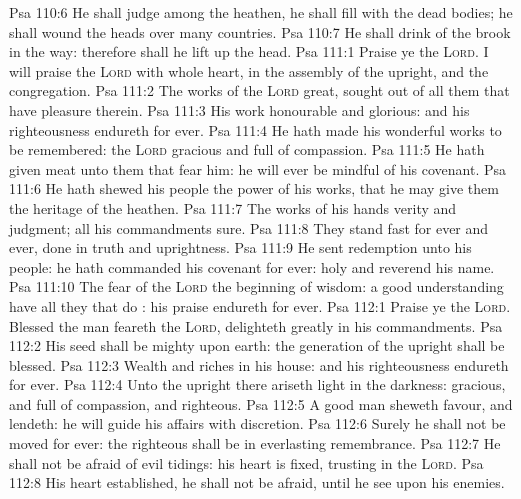 \vs Psa 110:6 He shall judge among the heathen, he shall fill  with the dead bodies; he shall wound the heads over many countries.
\vs Psa 110:7 He shall drink of the brook in the way: therefore shall he lift up the head.
\vs Psa 111:1 Praise ye the \textsc{Lord}. I will praise the \textsc{Lord} with  whole heart, in the assembly of the upright, and  the congregation.
\vs Psa 111:2 The works of the \textsc{Lord}  great, sought out of all them that have pleasure therein.
\vs Psa 111:3 His work  honourable and glorious: and his righteousness endureth for ever.
\vs Psa 111:4 He hath made his wonderful works to be remembered: the \textsc{Lord}  gracious and full of compassion.
\vs Psa 111:5 He hath given meat unto them that fear him: he will ever be mindful of his covenant.
\vs Psa 111:6 He hath shewed his people the power of his works, that he may give them the heritage of the heathen.
\vs Psa 111:7 The works of his hands  verity and judgment; all his commandments  sure.
\vs Psa 111:8 They stand fast for ever and ever,  done in truth and uprightness.
\vs Psa 111:9 He sent redemption unto his people: he hath commanded his covenant for ever: holy and reverend  his name.
\vs Psa 111:10 The fear of the \textsc{Lord}  the beginning of wisdom: a good understanding have all they that do : his praise endureth for ever.
\vs Psa 112:1 Praise ye the \textsc{Lord}. Blessed  the man  feareth the \textsc{Lord},  delighteth greatly in his commandments.
\vs Psa 112:2 His seed shall be mighty upon earth: the generation of the upright shall be blessed.
\vs Psa 112:3 Wealth and riches  in his house: and his righteousness endureth for ever.
\vs Psa 112:4 Unto the upright there ariseth light in the darkness:  gracious, and full of compassion, and righteous.
\vs Psa 112:5 A good man sheweth favour, and lendeth: he will guide his affairs with discretion.
\vs Psa 112:6 Surely he shall not be moved for ever: the righteous shall be in everlasting remembrance.
\vs Psa 112:7 He shall not be afraid of evil tidings: his heart is fixed, trusting in the \textsc{Lord}.
\vs Psa 112:8 His heart  established, he shall not be afraid, until he see  upon his enemies.
